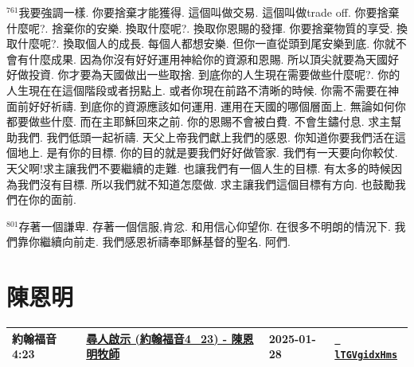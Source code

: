 \documentclass{book}
\begin{document}
$^{761}$我要強調一樣.
你要捨棄才能獲得.
這個叫做交易.
這個叫做trade off.
你要捨棄什麼呢?.
捨棄你的安樂.
換取什麼呢?.
換取你恩賜的發揮.
你要捨棄物質的享受.
換取什麼呢?.
換取個人的成長.
每個人都想安樂.
但你一直從頭到尾安樂到底.
你就不會有什麼成果.
因為你沒有好好運用神給你的資源和恩賜.
所以頂尖就要為天國好好做投資.
你才要為天國做出一些取捨.
到底你的人生現在需要做些什麼呢?.
你的人生現在在這個階段或者拐點上.
或者你現在前路不清晰的時候.
你需不需要在神面前好好祈禱.
到底你的資源應該如何運用.
運用在天國的哪個層面上.
無論如何你都要做些什麼.
而在主耶穌回來之前.
你的恩賜不會被白費.
不會生鏽付息.
求主幫助我們.
我們低頭一起祈禱.
天父上帝我們獻上我們的感恩.
你知道你要我們活在這個地上.
是有你的目標.
你的目的就是要我們好好做管家.
我們有一天要向你較仗.
天父啊!求主讓我們不要繼續的走難.
也讓我們有一個人生的目標.
有太多的時候因為我們沒有目標.
所以我們就不知道怎麼做.
求主讓我們這個目標有方向.
也鼓勵我們在你的面前.

$^{801}$存著一個謙卑.
存著一個信服,肯忿.
和用信心仰望你.
在很多不明朗的情況下.
我們靠你繼續向前走.
我們感恩祈禱奉耶穌基督的聖名.
阿們.
\newpage



\chapter{陳恩明}\label{ch:preacher13}
\begin{multicols}{3}
\minitoc
\end{multicols}
{ \scriptsize


\begin{xltabular}{\textwidth}{|p{0.15\textwidth} p{0.6\textwidth}|p{0.07\textwidth} p{0.1\textwidth}|}
\hline
約翰福音 4:23 & \hyperref[sec:lTGVgidxHms]{尋人啟示 (約翰福音4\_23) - 陳恩明牧師} & 2025-01-28 & \href{https://youtube.com/watch?v=lTGVgidxHms}{\texttt{ lTGVgidxHms}} \\
\hline
\end{xltabular}
}
\newpage
\end{document}
